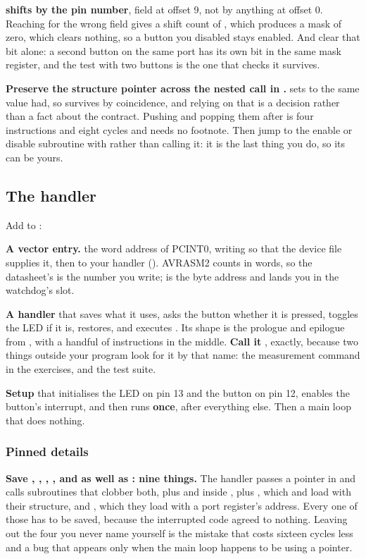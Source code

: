 \textbf{ shifts by the pin number}, field at offset 9, not by anything
at offset 0. Reaching for the wrong field gives a shift count of , which produces a mask
of zero, which clears nothing, so a button you disabled stays enabled. And clear that bit alone: a
second button on the same port has its own bit in the same mask register, and the test with two
buttons is the one that checks it survives.

\textbf{Preserve the structure pointer across the nested call in .}
 sets  to the same value  had, so  survives
by coincidence, and relying on that is a decision rather than a fact about the contract. Pushing
 and popping them after is four instructions and eight cycles and needs no footnote.
Then jump to the enable or disable subroutine with  rather than calling it: it is the
last thing you do, so its  can be yours.

\subsection{The handler}
\label{c3:sec:handler}
Add to :

\textbf{A vector entry.}  the word address of PCINT0, writing  so
that the device file supplies it, then  to your handler ().
AVRASM2 counts  in words, so the datasheet's  is the number you write;
 is the byte address and lands you in the watchdog's slot.

\textbf{A handler} that saves what it uses, asks the button whether it is pressed, toggles the LED
if it is, restores, and executes . Its shape is the prologue and epilogue from
, with a handful of instructions in the middle. \textbf{Call it
}, exactly, because two things outside your program look for it by that name: the
measurement command in the exercises, and the test suite.

\textbf{Setup} that initialises the LED on pin 13 and the button on pin 12, enables the button's
interrupt, and then runs  \textbf{once}, after everything else. Then a main loop that
does nothing.

\subsubsection{Pinned details}
\textbf{Save , , , ,  and  as well
as : nine things.} The handler passes a pointer in  and calls subroutines
that clobber both, plus  and  inside , plus , which
 and  load with their structure, and , which they load
with a port register's address. Every one of those has to be saved, because the interrupted code
agreed to nothing. Leaving out the four you never name yourself is the mistake that costs sixteen
cycles less and a bug that appears only when the main loop happens to be using a pointer.

